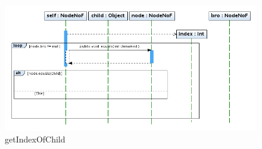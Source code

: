 \begin{figure}
\centering
\includegraphics[width=1\textwidth]{imgsSecuencia/NodeNoF/getIndexOfChild.png}
\caption{getIndexOfChild}
\end{figure}
\newpage
% 
% 
